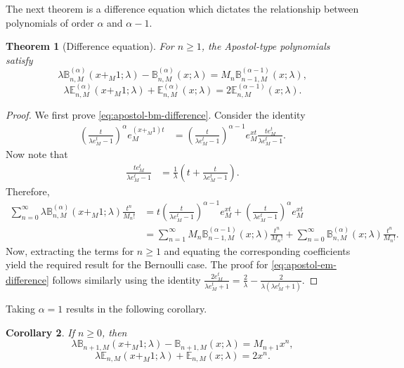 \documentclass[10pt,a4paper]{amsart}
\newtheorem{theorem}{Theorem}[section]
\newtheorem{corollary}[theorem]{Corollary}
\numberwithin{equation}{section}
\newcommand{\B}{\mathbb{B}}
\newcommand{\E}{\mathbb{E}}
\begin{document}
The next theorem is a difference equation which dictates the relationship between polynomials of order $\alpha$ and $\alpha-1$.

\begin{theorem}[Difference equation]\label{thm:difference}
For $n\ge 1$, the Apostol-type polynomials satisfy
\begin{equation}\label{eq:apostol-bm-difference}
\lambda \B_{n,M}^{(\alpha)}(x+_M1;\lambda) - \B_{n,M}^{(\alpha)}(x;\lambda) = M_n \B_{n-1,M}^{(\alpha-1)}(x;\lambda),
\end{equation}
\begin{equation}\label{eq:apostol-em-difference}
\lambda \E_{n,M}^{(\alpha)}(x+_M1;\lambda) + \E_{n,M}^{(\alpha)}(x;\lambda) = 2 \E_{n,M}^{(\alpha-1)}(x;\lambda).
\end{equation}
\end{theorem}

\begin{proof}
We first prove \eqref{eq:apostol-bm-difference}. Consider the identity
\begin{align*}
\left(\frac{t}{\lambda e_M^t-1}\right)^\alpha e_M^{(x+_M1)t} &= \left(\frac{t}{\lambda e_M^t-1}\right)^{\alpha-1} e_M^{xt} \frac{t e_M^t}{\lambda e_M^t-1}.
\end{align*}
Now note that
\begin{align*}
\frac{t e_M^t}{\lambda e_M^t-1} &= \frac{1}{\lambda}\left(t + \frac{t}{\lambda e_M^t-1}\right).
\end{align*}
Therefore,
\begin{align*}
\sum_{n=0}^\infty \lambda\B_{n,M}^{(\alpha)}(x+_M1;\lambda)\frac{t^n}{M_n!} &= t\left(\frac{t}{\lambda e_M^t-1}\right)^{\alpha-1} e_M^{xt} + \left(\frac{t}{\lambda e_M^t-1}\right)^{\alpha} e_M^{xt} \\
&= \sum_{n=1}^\infty M_n \B_{n-1,M}^{(\alpha-1)}(x;\lambda)\frac{t^n}{M_n!} + \sum_{n=0}^\infty \B_{n,M}^{(\alpha)}(x;\lambda)\frac{t^n}{M_n!}.
\end{align*}
Now, extracting the terms for $n \geq 1$ and equating the corresponding coefficients yield the required result for the Bernoulli case. The proof for \eqref{eq:apostol-em-difference} follows similarly using the identity $\frac{2e_M^t}{\lambda e_M^t+1} = \frac{2}{\lambda} - \frac{2}{\lambda(\lambda e_M^t+1)}$.
\end{proof}
\noindent Taking $\alpha = 1$ results in the following corollary.
\begin{corollary} \label{th:numcol}
If $n \geq 0$, then
\[
\lambda \B_{n+1,M}(x+_M1;\lambda) - \B_{n+1,M}(x;\lambda) = M_{n+1} x^{n},
\]
\[
\lambda \E_{n,M}(x+_M1;\lambda) + \E_{n,M}(x;\lambda) = 2 x^n.
\]
\end{corollary}
\end{document}
